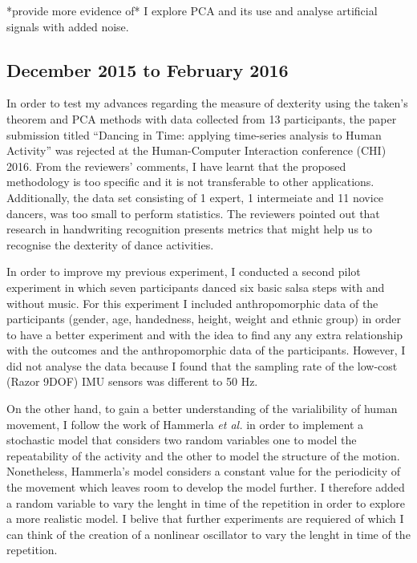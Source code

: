 \documentclass[9pt,journal,onecolumn,compsoc]{IEEEtran}
\begin{document}
*provide more evidence of* I explore PCA and its use and analyse artificial signals with added noise.



\subsection{December 2015 to February 2016}
In order to test my advances regarding the measure of dexterity 
using the taken's theorem and PCA methods with data collected from 13 participants,
the paper submission titled ``Dancing in Time: applying time-series analysis to Human Activity''
was rejected at the Human-Computer Interaction conference (CHI) 2016. 
From the reviewers' comments, 
I have learnt that the proposed methodology is too specific and it is not transferable to other applications.
Additionally, the data set consisting of 1 expert, 
1 intermeiate and 11 novice dancers, was too small to perform statistics.
The reviewers pointed out that research in handwriting recognition presents metrics 
that might help us to recognise the dexterity of dance activities.

In order to improve my previous experiment,
I conducted a second pilot experiment in which seven participants danced 
six basic salsa steps with and without music.
For this experiment I included anthropomorphic data of the participants 
(gender, age, handedness, height, weight and ethnic group)
 in order to have a better experiment and with the idea to
 find any any extra relationship with the outcomes and the anthropomorphic data
 of the participants. However, I did not analyse the data because I found that the
 sampling rate of the low-cost (Razor 9DOF) IMU sensors was different to 50 Hz.

On the other hand, to gain a better understanding of the varialibility of human movement,
I follow the work of Hammerla  \textit{et al.} \cite{Hammerla2011} in order to implement a stochastic model 
that considers 
two random variables one to model the repeatability of the activity 
and the other to model the structure of the motion.
Nonetheless, Hammerla's model considers a constant value for the periodicity of the movement 
which leaves room to develop the model further.
I therefore added a random variable to vary the lenght in time of the 
repetition in order to explore a more realistic model. I belive that further experiments 
are requiered of which I can think of the creation of a nonlinear oscillator to vary the
lenght in time of the repetition.
\end{document}
